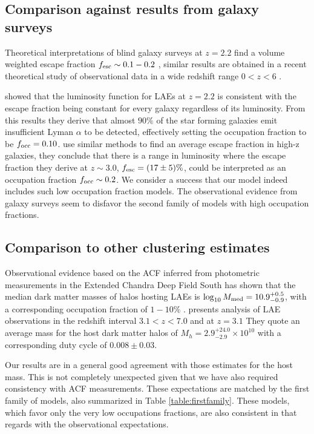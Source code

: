 \documentclass[usenatbib]{mn2e}
\newcommand{\ly}{{\ifmmode{{\rm Ly}\alpha}\else{Ly$\alpha$~}\fi}}
\newcommand{\hMsun}{{\ifmmode{h^{-1}{\rm
        {M_{\odot}}}}\else{$h^{-1}{\rm{M_{\odot}}}$}\fi}}
\newcommand{\Msun}{{\ifmmode{{\rm {M_{\odot}}}}\else{${\rm{M_{\odot}}}$}\fi}}
\begin{document}
\subsection{Comparison against results from galaxy surveys}

Theoretical interpretations of blind galaxy surveys at $z=2.2$ find a
volume weighted escape fraction $f_{\rm esc}\sim 0.1-0.2$
\cite{Hayes2010}, similar results are obtained in a recent theoretical
study of observational data in a wide redshift range $0<z<6$
\citep{Dijkstra2013}. 


\cite{Hayes2010} showed that the luminosity function for
LAEs at $z=2.2$ is consistent with the escape fraction being constant
for every galaxy regardless of its luminosity. From this results they
derive that almost $90\%$ of the star forming galaxies emit insufficient
Lyman $\alpha$ to be detected, effectively setting the occupation
fraction to be $f_{\rm occ}=0.10$. \cite{Dijkstra2013} use similar
methods to find an average \ly escape fraction in high-z galaxies,
they conclude that there is a range in \ly luminosity where the escape
fraction they derive at $z\sim 3.0$, $f_{\rm esc}=(17\pm 5)\%$, could
be interpreted as an occupation fraction $f_{\rm occ}\sim 0.2$. We
consider a success that our model indeed includes such low occupation
fraction models. The observational evidence from galaxy surveys seem
to disfavor the second family of models with high occupation
fractions.

\subsection{Comparison to other clustering estimates}

Observational evidence based on the ACF inferred from photometric
measurements in the Extended Chandra Deep Field South has shown that
the median dark matter masses of halos hosting LAEs is
$\log_{10}M_{\rm  med}=10.9^{+0.5}_{-0.9}$\Msun, with a corresponding
occupation fraction of $1-10\%$  \citep{Gawiser07}.  \cite{Ouchi2010}
presents analysis of LAE observations in the redshift interval
$3.1<z<7.0$ and at $z=3.1$ They quote an average mass for the host
dark matter halos of $M_{h}=2.9^{+24.0}_{-2.9}\times 10^{10}$ \hMsun
with a corresponding duty cycle of $0.008\pm 0.03$.  

Our results are in a general good agreement with those estimates for
the host mass. This is not completely unexpected given that we have
also required consistency with ACF measurements. These expectations
are matched by the first family of models, also summarized in Table
\ref{table:firstfamily}. These models, which favor only the very
low occupations fractions, are also consistent in that regards with
the observational expectations.
\end{document}
